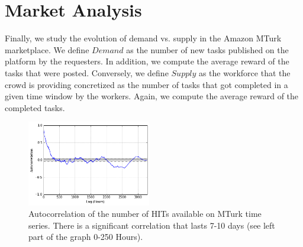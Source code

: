 \section{Market Analysis}
\label{sec:market}
Finally, we study the evolution of demand vs. supply in the Amazon MTurk marketplace. We define $Demand$ as the number of new tasks published on the platform by the requesters. In addition, we compute the average reward of the tasks that were posted. Conversely, we define $Supply$ as the workforce that the crowd is providing concretized as the number of tasks that got completed in a given time window by the workers. Again, we compute the average reward of the completed tasks.

\begin{figure}[tb]
	\centering
		\includegraphics[width=0.48\textwidth]{figures/autocorrelation_plot}
	\caption{Autocorrelation of the number of HITs available on MTurk time series.
There is a significant correlation that lasts 7-10 days (see left part of the graph 0-250 Hours).}
	\label{fig:autocorrelation1}
\end{figure}

